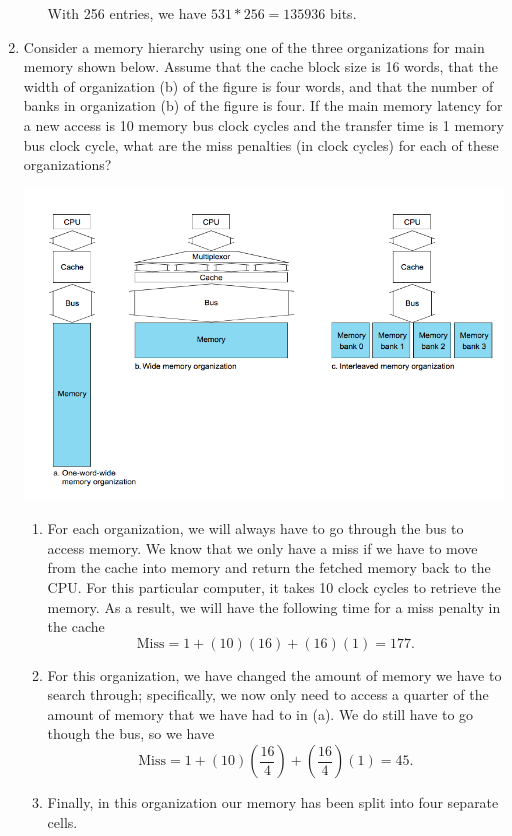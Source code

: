 \documentclass{article}
\begin{document}
\begin{enumerate}
\begin{enumerate}
With 256 entries, we have $531 * 256 = 135936$ bits.
\end{enumerate}
\item Consider a memory hierarchy using one of the three organizations for main memory shown below.
Assume that the cache block size is 16 words, that the width of organization (b) of the figure is four words,
and that the number of banks in organization (b) of the figure is four.
If the main memory latency for a new access is 10 memory bus clock cycles and the transfer time is 1 memory bus clock cycle, what are the miss penalties (in clock cycles) for each of these organizations?
\begin{center}
\includegraphics[scale=0.5]{hw5_graphic2}
\end{center}
\begin{enumerate}
\item For each organization, we will always have to go through the bus to access memory.
We know that we only have a miss if we have to move from the cache into memory and return the fetched memory back to the CPU.
For this particular computer, it takes 10 clock cycles to retrieve the memory.
As a result, we will have the following time for a miss penalty in the cache
\[
\text{Miss} = 1 + (10)(16) + (16)(1) = 177.
\]
\item For this organization, we have changed the amount of memory we have to search through; specifically, we now only need to access a quarter of the amount of memory that we have had to in (a).
We do still have to go though the bus, so we have
\[
\text{Miss} = 1 + (10)\left(\frac{16}{4}\right) + \left(\frac{16}{4}\right)(1) = 45.
\]
\item Finally, in this organization our memory has been split into four separate cells.

\end{enumerate}
\end{enumerate}
\end{document}
